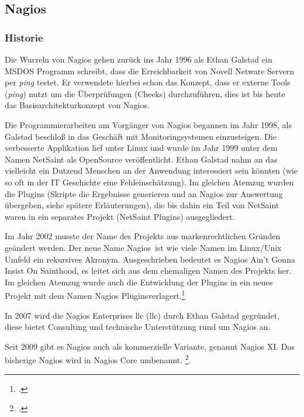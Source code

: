 \documentclass[12pt,a4paper,parskip,listof=totoc,bibliography=totoc]{scrreprt}
\begin{document}
	\subsection{Nagios}
	
	\subsubsection{Historie}
	Die Wurzeln von Nagios gehen zurück ins Jahr 1996 als Ethan Galstad ein MSDOS Programm schreibt, dass die Erreichbarkeit von Novell Netware Servern per \textit{ping} testet. Er verwendete hierbei schon das Konzept, dass er externe Tools (\textit{ping}) nutzt um die Überprüfungen (\glqq Checks\grqq) durchzuführen, dies ist bis heute das Basisarchitekturkonzept von Nagios.
	
	Die Programmierarbeiten am Vorgänger von Nagios begannen im Jahr 1998, als Galstad beschloß in das Geschäft mit Monitoringsystemen einzusteigen. Die verbesserte Applikation lief unter Linux und wurde im Jahr 1999 unter dem Namen NetSaint als OpenSource veröffentlicht. Ethan Galstad nahm an das vielleicht ein Dutzend Menschen an der Anwendung interessiert sein könnten (wie so oft in der IT Geschichte eine Fehleinschätzung). Im gleichen Atemzug wurden die Plugins (Skripte die Ergebnisse generieren und an Nagios zur Auswertung übergeben, siehe spätere Erläuterungen), die bis dahin ein Teil von NetSaint waren in ein separates Projekt (NetSaint Plugins) ausgegliedert.
	
	Im Jahr 2002 musste der Name des Projekts aus markenrechtlichen Gründen geändert werden. Der neue Name \glqq Nagios\grqq\ ist wie viele Namen im Linux/Unix Umfeld ein rekursives Akronym. Ausgeschrieben bedeutet es \glqq Nagios Ain’t Gonna Insist On Sainthood\grqq, es leitet sich aus dem ehemaligen Namen des Projekts her. Im gleichen Atemzug wurde auch die Entwicklung der Plugins in ein neues Projekt mit dem Namen \glqq Nagios Plugins\grqq verlagert.\footcite{nagiosnamefaq}
	
	In 2007 wird die Nagios Enterprises \acrshort{llc} (\acrlong{llc}) durch Ethan Galstad gegründet, diese bietet Consulting und technische Unterstützung rund um Nagios an.
	
	Seit 2009 gibt es Nagios auch als kommerzielle Variante, genannt Nagios XI. Das bisherige Nagios wird in Nagios Core umbenannt.
	\footcite{nagioshistory}. 
	
\end{document}
